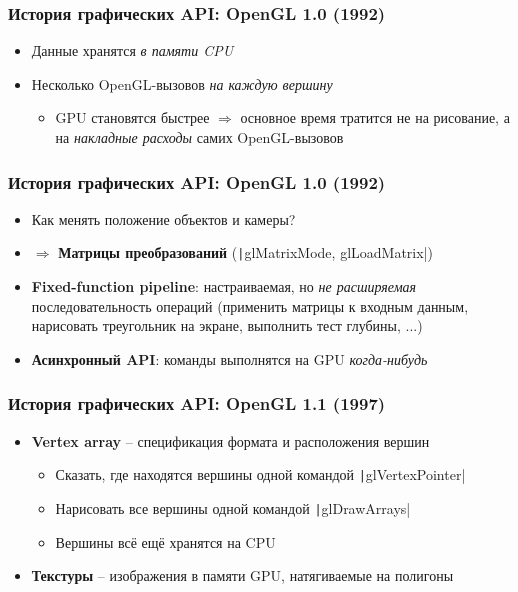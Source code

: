 \documentclass[10pt]{beamer}
\begin{document}
\begin{frame}[fragile]
\frametitle{История графических API: OpenGL 1.0 (1992)}
\begin{itemize}
\item Данные хранятся \textit{в памяти CPU}
\pause
\item Несколько OpenGL-вызовов \textit{на каждую вершину}
\pause
\begin{itemize}
\item GPU становятся быстрее $\Longrightarrow$ основное время тратится не на рисование, а на \textit{накладные расходы} самих OpenGL-вызовов
\end{itemize}
\end{itemize}
\end{frame}

\begin{frame}[fragile]
\frametitle{История графических API: OpenGL 1.0 (1992)}
\begin{itemize}
\item Как менять положение объектов и камеры?
\pause
\item $\Longrightarrow$ \textbf{Матрицы преобразований} (\texttt|glMatrixMode, glLoadMatrix|)
\pause
\item \textbf{Fixed-function pipeline}: настраиваемая, но \textit{не расширяемая} последовательность операций (применить матрицы к входным данным, нарисовать треугольник на экране, выполнить тест глубины, ...)
\pause
\item \textbf{Асинхронный API}: команды выполнятся на GPU \textit{когда-нибудь}
\end{itemize}
\end{frame}

\begin{frame}[fragile]
\frametitle{История графических API: OpenGL 1.1 (1997)}
\begin{itemize}
\item \textbf{Vertex array} -- спецификация формата и расположения вершин
\begin{itemize}
\item Сказать, где находятся вершины одной командой \texttt|glVertexPointer|
\item Нарисовать все вершины одной командой \texttt|glDrawArrays|
\item Вершины всё ещё хранятся на CPU
\end{itemize}
\pause
\item \textbf{Текстуры} -- изображения в памяти GPU, натягиваемые на полигоны
\end{itemize}
\end{frame}
\end{document}
